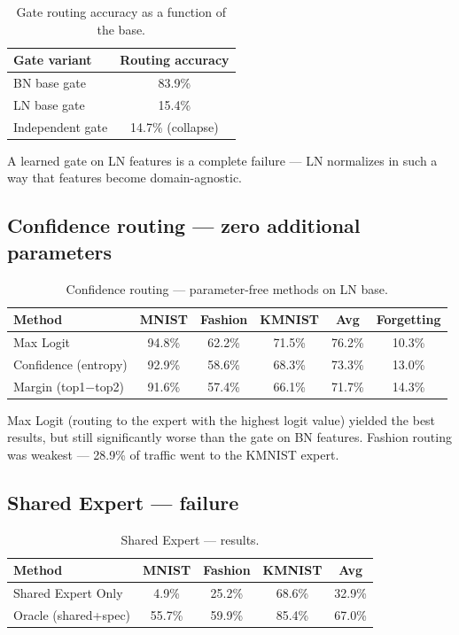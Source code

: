 \documentclass[11pt,a4paper]{report}
\begin{document}
\begin{table}[h]
\centering
\caption{Gate routing accuracy as a function of the base.}
\begin{tabular}{l c}
\hline
\textbf{Gate variant} & \textbf{Routing accuracy} \\
\hline
BN base gate & 83.9\% \\
LN base gate & 15.4\% \\
Independent gate & 14.7\% (collapse) \\
\hline
\end{tabular}
\end{table}

A learned gate on LN features is a complete failure --- LN normalizes in such a way that features become domain-agnostic.

\subsection{Confidence routing --- zero additional parameters}

\begin{table}[h]
\centering
\caption{Confidence routing --- parameter-free methods on LN base.}
\begin{tabular}{l c c c c c}
\hline
\textbf{Method} & \textbf{MNIST} & \textbf{Fashion} & \textbf{KMNIST} & \textbf{Avg} & \textbf{Forgetting} \\
\hline
Max Logit & 94.8\% & 62.2\% & 71.5\% & 76.2\% & 10.3\% \\
Confidence (entropy) & 92.9\% & 58.6\% & 68.3\% & 73.3\% & 13.0\% \\
Margin (top1$-$top2) & 91.6\% & 57.4\% & 66.1\% & 71.7\% & 14.3\% \\
\hline
\end{tabular}
\end{table}

Max Logit (routing to the expert with the highest logit value) yielded the best results, but still significantly worse than the gate on BN features. Fashion routing was weakest --- 28.9\% of traffic went to the KMNIST expert.

\subsection{Shared Expert --- failure}

\begin{table}[h]
\centering
\caption{Shared Expert --- results.}
\begin{tabular}{l c c c c}
\hline
\textbf{Method} & \textbf{MNIST} & \textbf{Fashion} & \textbf{KMNIST} & \textbf{Avg} \\
\hline
Shared Expert Only & 4.9\% & 25.2\% & 68.6\% & 32.9\% \\
Oracle (shared+spec) & 55.7\% & 59.9\% & 85.4\% & 67.0\% \\
\hline
\end{tabular}
\end{table}
\end{document}
